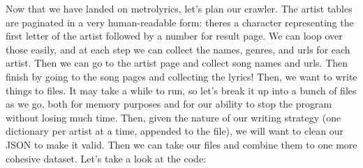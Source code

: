 \documentclass[12pt, twoside, reqno]{book}
\begin{document}
Now that we have landed on metrolyrics, let's plan our crawler. The artist tables are paginated in a very human-readable form: theres a character representing the first letter of the artist followed by a number for result page. We can loop over those easily, and at each step we can collect the names, genres, and urls for each artist. Then we can go to the artist page and collect song names and urls. Then finish by going to the song pages and collecting the lyrics! Then, we want to write things to files. It may take a while to run, so let's break it up into a bunch of files as we go, both for memory purposes and for our ability to stop the program without losing much time. Then, given the nature of our writing strategy (one dictionary per artist at a time, appended to the file), we will want to clean our JSON to make it valid. Then we can take our files and combine them to one more cohesive dataset. Let's take a look at the code:
\end{document}
